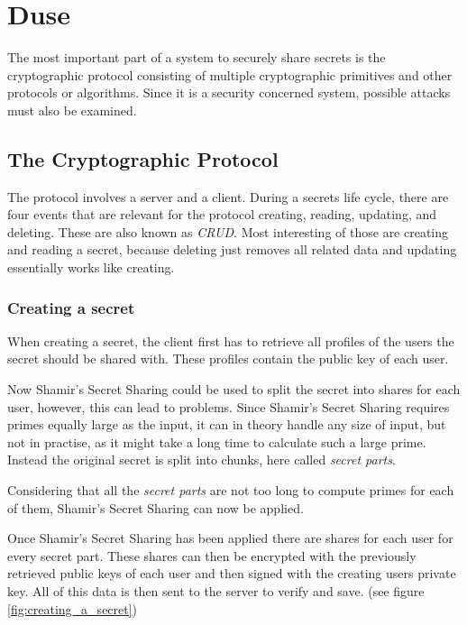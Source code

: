 \chapter{Duse}

The most important part of a system to securely share secrets is the
cryptographic protocol consisting of multiple cryptographic primitives and
other protocols or algorithms. Since it is a security concerned system,
possible attacks must also be examined.

\section{The Cryptographic Protocol}
\label{sec:duse:crypto_protocol}

The protocol involves a server and a client. During a secrets life cycle, there
are four events that are relevant for the protocol creating, reading, updating,
and deleting. These are also known as \textit{CRUD}. Most interesting of those
are creating and reading a secret, because deleting just removes all related
data and updating essentially works like creating.

\subsection{Creating a secret}

When creating a secret, the client first has to retrieve all profiles of the
users the secret should be shared with. These profiles contain the public key
of each user.

Now Shamir's Secret Sharing could be used to split the secret into shares for
each user, however, this can lead to problems. Since Shamir's Secret Sharing
requires primes equally large as the input, it can in theory handle any size of
input, but not in practise, as it might take a long time to calculate such a
large prime. Instead the original secret is split into chunks, here called
\textit{secret parts}.

Considering that all the \textit{secret parts} are not too long to compute
primes for each of them, Shamir's Secret Sharing can now be applied.

Once Shamir's Secret Sharing has been applied there are shares for each user
for every secret part. These shares can then be encrypted with the previously
retrieved public keys of each user and then signed with the creating users
private key. All of this data is then sent to the server to verify and save.
(see figure \ref{fig:creating_a_secret})

